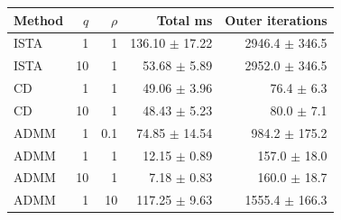 \begin{tabular}{lrrrr}
\toprule
Method & $q$ & $\rho$ & Total ms & Outer iterations \\
\midrule
ISTA & 1 & 1 & 136.10 $\pm$ 17.22 & 2946.4 $\pm$ 346.5 \\
ISTA & 10 & 1 & 53.68 $\pm$ 5.89 & 2952.0 $\pm$ 346.5 \\
CD & 1 & 1 & 49.06 $\pm$ 3.96 & 76.4 $\pm$ 6.3 \\
CD & 10 & 1 & 48.43 $\pm$ 5.23 & 80.0 $\pm$ 7.1 \\
ADMM & 1 & 0.1 & 74.85 $\pm$ 14.54 & 984.2 $\pm$ 175.2 \\
ADMM & 1 & 1 & 12.15 $\pm$ 0.89 & 157.0 $\pm$ 18.0 \\
ADMM & 10 & 1 & 7.18 $\pm$ 0.83 & 160.0 $\pm$ 18.7 \\
ADMM & 1 & 10 & 117.25 $\pm$ 9.63 & 1555.4 $\pm$ 166.3 \\
\bottomrule
\end{tabular}
